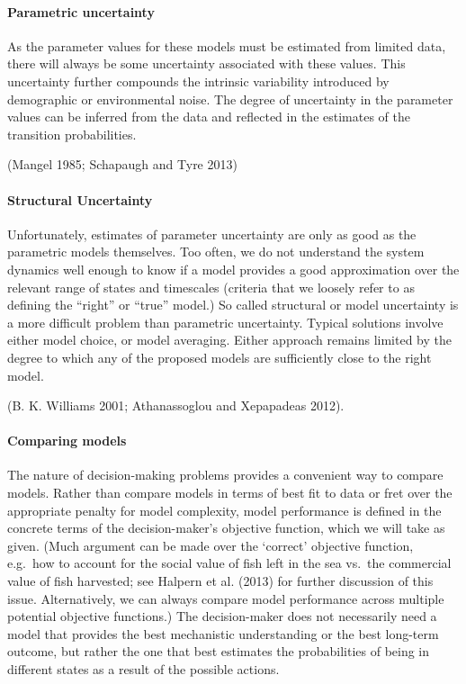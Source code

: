 \documentclass[author-year, review]{elsarticle} %
\begin{document}
\paragraph{Parametric uncertainty}

As the parameter values for these models must be estimated from limited
data,\\there will always be some uncertainty associated with these
values. This uncertainty further compounds the intrinsic variability
introduced by demographic or environmental noise. The degree of
uncertainty in the parameter values can be inferred from the data and
reflected in the estimates of the transition probabilities.

(Mangel 1985; Schapaugh and Tyre 2013)

\paragraph{Structural Uncertainty}

Unfortunately, estimates of parameter uncertainty are only as good as
the parametric models themselves. Too often, we do not understand the
system dynamics well enough to know if a model provides a good
approximation over the relevant range of states and timescales (criteria
that we loosely refer to as defining the ``right'' or ``true'' model.)
So called structural or model uncertainty is a more difficult problem
than parametric uncertainty. Typical solutions involve either model
choice, or model averaging. Either approach remains limited by the
degree to which any of the proposed models are sufficiently close to the
right model.

(B. K. Williams 2001; Athanassoglou and Xepapadeas 2012).

\paragraph{Comparing models}

The nature of decision-making problems provides a convenient way to
compare models. Rather than compare models in terms of best fit to data
or fret over the appropriate penalty for model complexity, model
performance is defined in the concrete terms of the decision-maker's
objective function, which we will take as given. (Much argument can be
made over the `correct' objective function, e.g.~how to account for the
social value of fish left in the sea vs.~the commercial value of fish
harvested; see Halpern et al. (2013) for further discussion of this
issue. Alternatively, we can always compare model performance across
multiple potential objective functions.) The decision-maker does not
necessarily need a model that provides the best mechanistic
understanding or the best long-term outcome, but rather the one that
best estimates the probabilities of being in different states as a
result of the possible actions.
\end{document}
